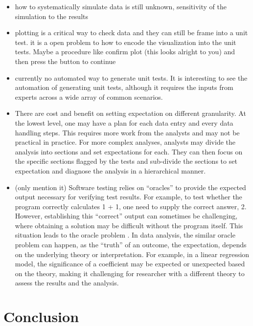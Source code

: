 \documentclass[
]{jds}
\begin{document}
\begin{itemize}
\item
  how to systematically simulate data is still unknown, sensitivity of
  the simulation to the results
\item
  plotting is a critical way to check data and they can still be frame
  into a unit test. it is a open problem to how to encode the
  visualization into the unit tests. Maybe a procedure like confirm plot
  (this looks alright to you) and then press the button to continue
\item
  currently no automated way to generate unit tests. It is interesting
  to see the automation of generating unit tests, although it requires
  the inputs from experts across a wide array of common scenarios.
\item
  There are cost and benefit on setting expectation on different
  granularity. At the lowest level, one may have a plan for each data
  entry and every data handling steps. This requires more work from the
  analysts and may not be practical in practice. For more complex
  analyses, analysts may divide the analysis into sections and set
  expectations for each. They can then focus on the specific sections
  flagged by the tests and sub-divide the sections to set expectation
  and diagnose the analysis in a hierarchical manner.
\item
  (only mention it) Software testing relies on ``oracles'' to provide
  the expected output necessary for verifying test results. For example,
  to test whether the program correctly calculates 1 + 1, one need to
  supply the correct answer, 2. However, establishing this ``correct''
  output can sometimes be challenging, where obtaining a solution may be
  difficult without the program itself. This situation leads to the
  oracle problem \citep{barr2014oracle}. In data analysis, the similar
  oracle problem can happen, as the ``truth'' of an outcome, the
  expectation, depends on the underlying theory or interpretation. For
  example, in a linear regression model, the significance of a
  coefficient may be expected or unexpected based on the theory, making
  it challenging for researcher with a different theory to assess the
  results and the analysis.
\end{itemize}

\section{Conclusion}\label{sec-conclusion}


\renewcommand\refname{References}
  
\end{document}

